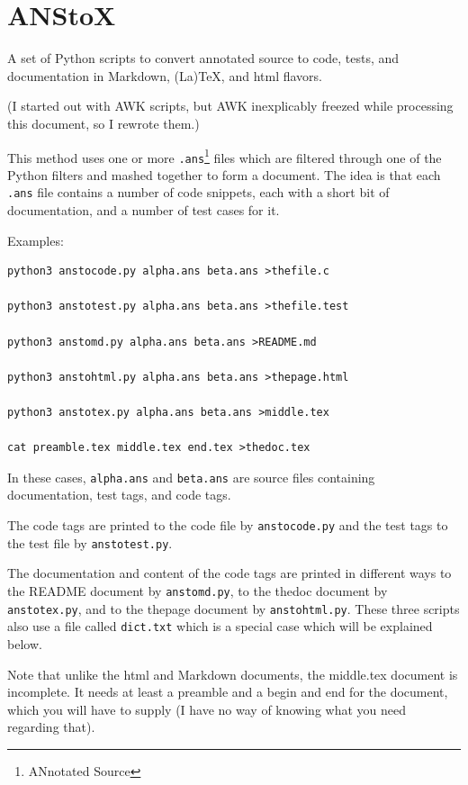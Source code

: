 
\part{ANStoX}
\label{anstox}

A set of Python scripts to convert annotated source to code, tests, and documentation in Markdown, (La)TeX, and html flavors.

(I started out with AWK scripts, but AWK inexplicably freezed while processing this document, so I rewrote them.)

This method uses one or more \texttt{.ans}\footnote{ANnotated Source} files which are filtered through one of the Python filters and mashed together to form a document. The idea is that each \texttt{.ans} file contains a number of code snippets, each with a short bit of documentation, and a number of test cases for it.

Examples:

\begin{verbatim}
python3 anstocode.py alpha.ans beta.ans >thefile.c

python3 anstotest.py alpha.ans beta.ans >thefile.test

python3 anstomd.py alpha.ans beta.ans >README.md

python3 anstohtml.py alpha.ans beta.ans >thepage.html

python3 anstotex.py alpha.ans beta.ans >middle.tex

cat preamble.tex middle.tex end.tex >thedoc.tex
\end{verbatim}

In these cases, \texttt{alpha.ans} and \texttt{beta.ans} are source files containing documentation, test tags, and code tags.

The code tags are printed to the code file by \texttt{anstocode.py} and the test tags to the test file by \texttt{anstotest.py}.

The documentation and content of the code tags are printed in different ways to the README document by \texttt{anstomd.py}, to the thedoc document by \texttt{anstotex.py}, and to the thepage document by \texttt{anstohtml.py}. These three scripts also use a file called \texttt{dict.txt} which is a special case which will be explained below.

\begin{pulledtext}

Note that unlike the html and Markdown documents, the middle.tex document is incomplete. It needs at least a preamble and a begin and end for the document, which you will have to supply (I have no way of knowing what you need regarding that).
\end{pulledtext}

